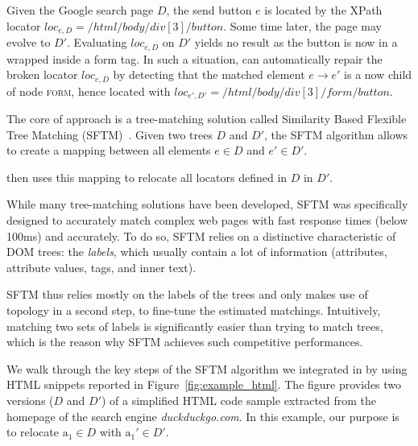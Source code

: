 \begin{ex}
Given the Google search page $D$, the send button $e$ is located by the XPath locator $loc_{e,D} = /html/body/div[3]/button$.
Some time later, the page may evolve to $D'$.
Evaluating $loc_{e,D}$ on $D'$ yields no result as the button is now in a wrapped inside a \textsf{form} tag.
In such a situation, \erratum{} can automatically repair the broken locator $loc_{e,D}$ by detecting that the matched element $e \to e'$ is a now child of node \textsc{form}, hence located with $loc_{e',D'} = /html/body/div[3]/form/button$.
\end{ex}

The core of \erratum approach is a tree-matching solution called Similarity Based Flexible Tree Matching (SFTM)~\cite{brisset2020sftm}. 
Given two trees $D$ and $D'$, the SFTM algorithm allows to create a mapping between all elements $e \in D$ and $e' \in D'$.

\erratum then uses this mapping to relocate all locators defined in $D$ in $D'$.

While many tree-matching solutions have been developed, SFTM was specifically designed to accurately match complex web pages with fast response times (below 100ms) and accurately.
To do so, SFTM relies on a distinctive characteristic of DOM trees: the \emph{labels}, which usually contain a lot of information (attributes, attribute values, tags, and inner text).

SFTM thus relies mostly on the labels of the trees and only makes use of topology in a second step, to fine-tune the estimated matchings.
Intuitively, matching two sets of labels is significantly easier than trying to match trees, which is the reason why SFTM achieves such competitive performances.

We walk through the key steps of the SFTM algorithm we integrated in \erratum{} by using HTML snippets reported in Figure~\ref{fig:example_html}.
The figure provides two versions ($D$ and $D'$) of a simplified HTML code sample extracted from the homepage of the search engine \textit{duckduckgo.com}.
In this example, our purpose is to relocate $\text{a}_1 \in D$ with $\text{a}_1' \in D'$.

